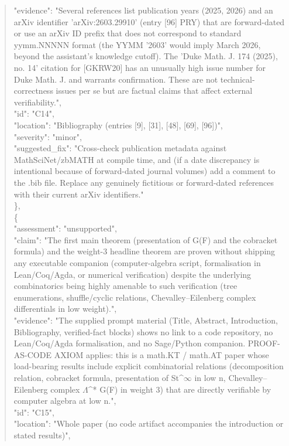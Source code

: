 \documentclass[11pt]{article}
\begin{document}
\begin{quote}
      "evidence": "Several references list publication years (2025, 2026) and an arXiv identifier 'arXiv:2603.29910' (entry [96] PRY) that are forward-dated or use an arXiv ID prefix that does not correspond to standard yymm.NNNNN format (the YYMM '2603' would imply March 2026, beyond the assistant's knowledge cutoff). The 'Duke Math. J. 174 (2025), no. 14' citation for [GKRW20] has an unusually high issue number for Duke Math. J. and warrants confirmation. These are not technical-correctness issues per se but are factual claims that affect external verifiability.",\\
      "id": "C14",\\
      "location": "Bibliography (entries [9], [31], [48], [69], [96])",\\
      "severity": "minor",\\
      "suggested\_fix": "Cross-check publication metadata against MathSciNet/zbMATH at compile time, and (if a date discrepancy is intentional because of forward-dated journal volumes) add a comment to the .bib file. Replace any genuinely fictitious or forward-dated references with their current arXiv identifiers."\\
    \},\\
    \{\\
      "assessment": "unsupported",\\
      "claim": "The first main theorem (presentation of G(F) and the cobracket formula) and the weight-3 headline theorem are proven without shipping any executable companion (computer-algebra script, formalisation in Lean/Coq/Agda, or numerical verification) despite the underlying combinatorics being highly amenable to such verification (tree enumerations, shuffle/cyclic relations, Chevalley--Eilenberg complex differentials in low weight).",\\
      "evidence": "The supplied prompt material (Title, Abstract, Introduction, Bibliography, verified-fact blocks) shows no link to a code repository, no Lean/Coq/Agda formalisation, and no Sage/Python companion. PROOF-AS-CODE AXIOM applies: this is a math.KT / math.AT paper whose load-bearing results include explicit combinatorial relations (decomposition relation, cobracket formula, presentation of St\^{}\ensuremath{\infty} in low n, Chevalley--Eilenberg complex \ensuremath{\Lambda}\^{}* G(F) in weight 3) that are directly verifiable by computer algebra at low n.",\\
      "id": "C15",\\
      "location": "Whole paper (no code artifact accompanies the introduction or stated results)",\\

\end{quote}
\end{document}
